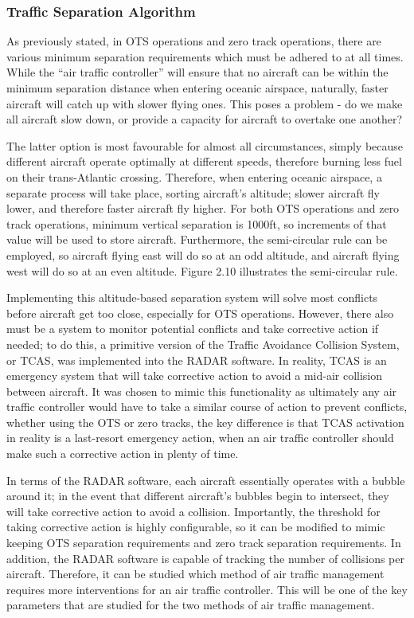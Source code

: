 \documentclass[stu, a4paper, 12pt, floatsintext]{apa7}
\numberwithin{figure}{section}
\numberwithin{table}{section}
\numberwithin{equation}{section}
\begin{document}
\subsubsection{Traffic Separation Algorithm}
As previously stated, in OTS operations and zero track operations, there are various minimum separation requirements which must be adhered to at all times. While the “air traffic controller” will ensure that no aircraft can be within the minimum separation distance when entering oceanic airspace, naturally, faster aircraft will catch up with slower flying ones. This poses a problem - do we make all aircraft slow down, or provide a capacity for aircraft to overtake one another? 

The latter option is most favourable for almost all circumstances, simply because different aircraft operate optimally at different speeds, therefore burning less fuel on their trans-Atlantic crossing. Therefore, when entering oceanic airspace, a separate process will take place, sorting aircraft’s altitude; slower aircraft fly lower, and therefore faster aircraft fly higher. For both OTS operations and zero track operations, minimum vertical separation is 1000ft, so increments of that value will be used to store aircraft. Furthermore, the semi-circular rule can be employed, so aircraft flying east will do so at an odd altitude, and aircraft flying west will do so at an even altitude. Figure 2.10 illustrates the semi-circular rule.  

Implementing this altitude-based separation system will solve most conflicts before aircraft get too close, especially for OTS operations. However, there also must be a system to monitor potential conflicts and take corrective action if needed; to do this, a primitive version of the Traffic Avoidance Collision System, or TCAS, was implemented into the RADAR software. In reality, TCAS is an emergency system that will take corrective action to avoid a mid-air collision between aircraft. It was chosen to mimic this functionality as ultimately any air traffic controller would have to take a similar course of action to prevent conflicts, whether using the OTS or zero tracks, the key difference is that TCAS activation in reality is a last-resort emergency action, when an air traffic controller should make such a corrective action in plenty of time. 

In terms of the RADAR software, each aircraft essentially operates with a bubble around it; in the event that different aircraft’s bubbles begin to intersect, they will take corrective action to avoid a collision. Importantly, the threshold for taking corrective action is highly configurable, so it can be modified to mimic keeping OTS separation requirements and zero track separation requirements. In addition, the RADAR software is capable of tracking the number of collisions per aircraft. Therefore, it can be studied which method of air traffic management requires more interventions for an air traffic controller. This will be one of the key parameters that are studied for the two methods of air traffic management.  
\end{document}

